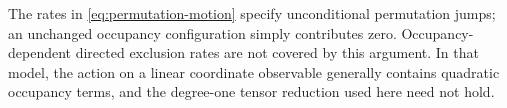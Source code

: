 \begin{remark}
The rates in \eqref{eq:permutation-motion} specify unconditional
permutation jumps; an unchanged occupancy configuration simply
contributes zero.  Occupancy-dependent directed exclusion rates are
not covered by this argument.  In that model, the action on a
linear coordinate observable generally contains quadratic occupancy
terms, and the degree-one tensor reduction used here need not hold.
\end{remark}
